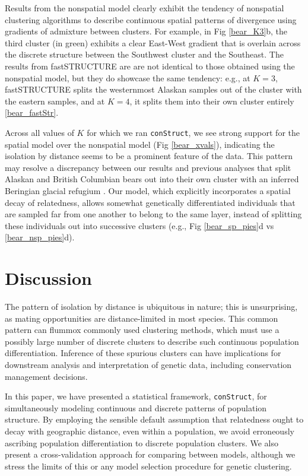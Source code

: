 \documentclass[12pt]{article}
\begin{document}
Results from the nonspatial model clearly exhibit the tendency 
of nonspatial clustering algorithms to describe continuous spatial patterns of divergence 
using gradients of admixture between clusters.
For example, in Fig \ref{bear_K3}b, 
the third cluster (in green) exhibits a clear East-West gradient that 
is overlain across the discrete structure between the Southwest cluster and the Southeast.
The results from fastSTRUCTURE are are not identical to 
those obtained using the nonspatial model, 
but they do showcase the same tendency: 
e.g., at $K=3$, fastSTRUCTURE splits the westernmost Alaskan samples 
out of the cluster with the eastern samples, 
and at $K=4$, it splits them into their own cluster entirely \ref{bear_fastStr}.

Across all values of $K$ for which we ran \texttt{conStruct},
we see strong support for the spatial model over the nonspatial model (Fig \ref{bear_xvals}),
indicating the isolation by distance seems to be a prominent feature of the data.
This pattern may resolve a discrepancy between our results and 
previous analyses that split Alaskan and British Columbian bears out 
into their own cluster with an inferred Beringian glacial refugium
\citep{Byun1997,Stone2000,Puckett2015}.
Our model, which explicitly incorporates a spatial decay of relatedness, 
allows somewhat genetically differentiated individuals 
that are sampled far from one another to belong to the same layer,
instead of splitting these individuals out into successive clusters 
(e.g., Fig \ref{bear_sp_pies}d vs \ref{bear_nsp_pies}d).

\section*{Discussion}

The pattern of isolation by distance is ubiquitous in nature;
this is unsurprising, as mating opportunities are distance-limited in most species.
This common pattern can flummox commonly used clustering methods, 
which must use a possibly large number of discrete clusters
to describe such continuous population differentiation.
Inference of these spurious clusters can have implications for 
downstream analysis and interpretation of genetic data, 
including conservation management decisions. 


In this paper, we have presented a statistical framework, \texttt{conStruct}, for simultaneously 
modeling continuous and discrete patterns of population structure.
By employing the sensible default assumption
that relatedness ought to decay with geographic distance, even within a population, 
we avoid erroneously ascribing population differentiation to discrete population clusters.
We also present a cross-validation approach for comparing between models, 
although we stress the limits of this or any model selection procedure for genetic clustering.
\end{document}
